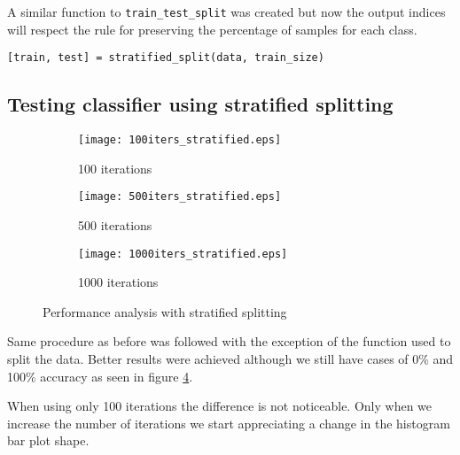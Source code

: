 A similar function to \texttt{train\_test\_split} was created but now the output indices will respect the rule for preserving the percentage of samples for each class. 
\begin{lstlisting}
[train, test] = stratified_split(data, train_size)
\end{lstlisting}

\subsection{Testing classifier using stratified splitting}
\begin{figure}[t]
	\centering
	\begin{subfigure}{.45\textwidth}
		\centering
		\texttt{[image: 100iters\_stratified.eps]}
		\caption{100 iterations}
		\label{fig:100iters_stratified}
	\end{subfigure}
	\begin{subfigure}{.45\textwidth}
		\centering
		\texttt{[image: 500iters\_stratified.eps]}
		\caption{500 iterations}
		\label{fig:500iters_stratified}
	\end{subfigure}
	\begin{subfigure}{.45\textwidth}
		\centering
		\texttt{[image: 1000iters\_stratified.eps]}
		\caption{1000 iterations}
		\label{fig:1000iters_stratified}
	\end{subfigure}
	\caption{Performance analysis with stratified splitting}
	\label{fig:stratified_splitting}
\end{figure}

Same procedure as before was followed with the exception of the function used to split the data. Better results were achieved although we still have cases of 0\% and 100\% accuracy as seen in figure \ref{fig:stratified_splitting}.

When using only 100 iterations the difference is not noticeable. Only when we increase the number of iterations we start appreciating a change in the histogram bar plot shape.


